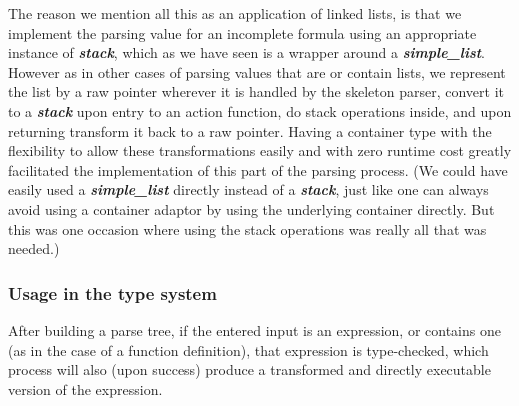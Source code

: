 \documentclass[12pt]{article}
\theoremstyle{plain}
\theoremstyle{definition}
\def\smpl.{\textbf{\textit{simple\_\!list}}}
\def\stack.{\textbf{\textit{stack}}}
\begin{document}
The reason we mention all this as an application of linked lists, is that we
implement the parsing value for an incomplete formula using an appropriate
instance of \stack., which as we have seen is a wrapper around a \smpl.. However
as in other cases of parsing values that are or contain lists, we represent the
list by a raw pointer wherever it is handled by the skeleton parser, convert it
to a \stack. upon entry to an action function, do stack operations inside, and
upon returning transform it back to a raw pointer. Having a container type with
the flexibility to allow these transformations easily and with zero runtime cost
greatly facilitated the implementation of this part of the parsing process. (We
could have easily used a \smpl. directly instead of a \stack., just like one can
always avoid using a container adaptor by using the underlying container
directly. But this was one occasion where using the stack operations was really
all that was needed.)

\subsubsection{Usage in the type system}

After building a parse tree, if the entered input is an expression, or contains
one (as in the case of a function definition), that expression is type-checked,
which process will also (upon success) produce a transformed and directly
executable version of the expression.
\end{document}
